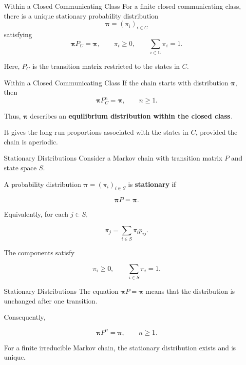 \documentclass[
  ignorenonframetext,
  aspectratio=169,
]{beamer}
\begin{document}
\begin{frame}{Within a Closed Communicating Class}
\protect{}\label{within-a-closed-communicating-class-1}
For a finite closed communicating class, there is a unique stationary
probability distribution \[
\boldsymbol{\pi}=(\pi_i)_{i\in C}
\] satisfying \[
\boldsymbol{\pi}P_C=\boldsymbol{\pi},
\qquad
\pi_i\geq0,
\qquad
\sum_{i\in C}\pi_i=1.
\]

Here, \(P_C\) is the transition matrix restricted to the states in
\(C\).
\end{frame}

\begin{frame}{Within a Closed Communicating Class}
\protect{}\label{within-a-closed-communicating-class-2}
If the chain starts with distribution \(\boldsymbol{\pi}\), then \[
\boldsymbol{\pi}P_C^n=\boldsymbol{\pi},
\qquad n\geq1.
\]

Thus, \(\boldsymbol{\pi}\) describes an \textbf{equilibrium distribution
within the closed class}.

It gives the long-run proportions associated with the states in \(C\),
provided the chain is aperiodic.
\end{frame}

\begin{frame}{Stationary Distributions}
\protect{}\label{stationary-distributions}
Consider a Markov chain with transition matrix \(P\) and state space
\(S\).

A probability distribution \(\boldsymbol{\pi}=(\pi_i)_{i\in S}\) is
\textbf{stationary} if

\[
\boxed{\boldsymbol{\pi}P=\boldsymbol{\pi}.}
\]

Equivalently, for each \(j\in S\),

\[
\pi_j=\sum_{i\in S}\pi_i p_{ij}.
\]

The components satisfy

\[
\pi_i\geq0,
\qquad
\sum_{i\in S}\pi_i=1.
\]
\end{frame}

\begin{frame}{Stationary Distributions}
\protect{}\label{stationary-distributions-1}
The equation \(\boldsymbol{\pi}P=\boldsymbol{\pi}\) means that the
distribution is unchanged after one transition.

Consequently,

\[
\boxed{\boldsymbol{\pi}P^n=\boldsymbol{\pi},\qquad n\geq1.}
\]

For a finite irreducible Markov chain, the stationary distribution
exists and is unique.
\end{frame}
\end{document}
